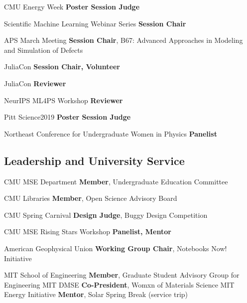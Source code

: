 {CMU Energy Week}
{\textbf{Poster Session Judge}}
{}


{Scientific Machine Learning Webinar Series}
{\textbf{Session Chair}}
{}

{APS March Meeting}
{\textbf{Session Chair}, B67: Advanced Approaches in Modeling and Simulation of Defects}
{}

{JuliaCon}
{\textbf{Session Chair, Volunteer}}
{}

{JuliaCon}
{\textbf{Reviewer}}
{}

{NeurIPS ML4PS Workshop}
{\textbf{Reviewer}}
{}

{Pitt Science2019}
{\textbf{Poster Session Judge}}
{}

{Northeast Conference for Undergraduate Women in Physics}
{\textbf{Panelist}}
{}

\vspace{-2mm}
\subsection{Leadership and University Service}
                      {CMU MSE Department}
                      {\textbf{Member}, Undergraduate Education Committee}
                      {}

                      {CMU Libraries}
                      {\textbf{Member}, Open Science Advisory Board}
                      {}

                      {CMU Spring Carnival}
                      {\textbf{Design Judge}, Buggy Design Competition}
                      {}
                      
                      {CMU MSE Rising Stars Workshop}
                      {\textbf{Panelist, Mentor}}
                      {}


{American Geophysical Union}
{\textbf{Working Group Chair}, Notebooks Now! Initiative}
{}

{MIT School of Engineering}
{\textbf{Member}, Graduate Student Advisory Group for Engineering}
{}
{MIT DMSE}
{\textbf{Co-President}, Womxn of Materials Science}
{}
{MIT Energy Initiative}
{\textbf{Mentor}, Solar Spring Break (service trip)}
{}

